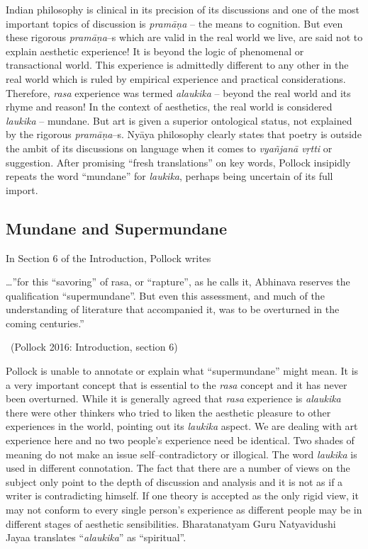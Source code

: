 Indian philosophy is clinical in its precision of its discussions and one of the most important topics of discussion is \textit{pramāṇa} – the means to cognition. But even these rigorous \textit{pramāṇa}–s which are valid in the real world we live, are said not to explain aesthetic experience! It is beyond the logic of phenomenal or transactional world. This experience is admittedly different to any other in the real world which is ruled by empirical experience and practical considerations. Therefore, \textit{rasa} experience was termed \textit{alaukika} – beyond the real world and its rhyme and reason! In the context of aesthetics, the real world is considered \textit{laukika} – mundane. But art is given a superior ontological status, not explained by the rigorous \textit{pramāṇa}–s. Nyāya philosophy clearly states that poetry is outside the ambit of its discussions on language when it comes to \textit{vyañjanā vṛtti} or suggestion. After promising “fresh translations” on key words, Pollock insipidly repeats the word “mundane” for \textit{laukika}, perhaps being uncertain of its full import.


\subsection*{Mundane and Supermundane}

In Section 6 of the Introduction, Pollock writes

\begin{myquote}
…”for this “savoring” of rasa, or “rapture”, as he calls it, Abhinava reserves the qualification “supermundane”. But even this assessment, and much of the understanding of literature that accompanied it, was to be overturned in the coming centuries.” 

~\hfill (Pollock 2016: Introduction, section 6)
\end{myquote}

Pollock is unable to annotate or explain what “supermundane” might mean. It is a very important concept that is essential to the \textit{rasa} concept and it has never been overturned. While it is generally agreed that \textit{rasa} experience is \textit{alaukika} there were other thinkers who tried to liken the aesthetic pleasure to other experiences in the world, pointing out its \textit{laukika} aspect. We are dealing with art experience here and no two people’s experience need be identical. Two shades of meaning do not make an issue self–contradictory or illogical. The word \textit{laukika} is used in different connotation. The fact that there are a number of views on the subject only point to the depth of discussion and analysis and it is not as if a writer is contradicting himself. If one theory is accepted as the only rigid view, it may not conform to every single person’s experience as different people may be in different stages of aesthetic sensibilities. Bharatanatyam Guru Natyavidushi Jayaa translates “\textit{alaukika}” as “spiritual”.

